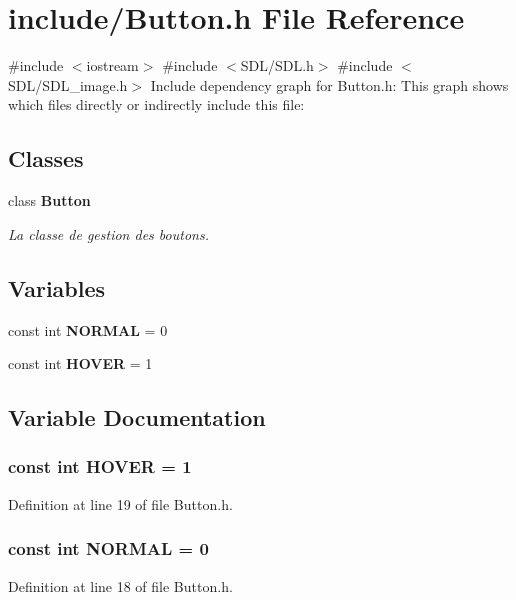 \section{include/\-Button.h \-File \-Reference}
\label{_button_8h}
{\ttfamily \#include $<$iostream$>$}\*
{\ttfamily \#include $<$\-S\-D\-L/\-S\-D\-L.\-h$>$}\*
{\ttfamily \#include $<$\-S\-D\-L/\-S\-D\-L\-\_\-image.\-h$>$}\*
\-Include dependency graph for \-Button.\-h\-:
\-This graph shows which files directly or indirectly include this file\-:
\subsection*{\-Classes}
\begin{DoxyCompactItemize}
\item 
class {\bf \-Button}
\begin{DoxyCompactList}\small\item\em \-La classe de gestion des boutons. \end{DoxyCompactList}\end{DoxyCompactItemize}
\subsection*{\-Variables}
\begin{DoxyCompactItemize}
\item 
const int {\bf \-N\-O\-R\-M\-A\-L} = 0
\item 
const int {\bf \-H\-O\-V\-E\-R} = 1
\end{DoxyCompactItemize}


\subsection{\-Variable \-Documentation}
\subsubsection[{\-H\-O\-V\-E\-R}]{\setlength{\rightskip}{0pt plus 5cm}const int {\bf \-H\-O\-V\-E\-R} = 1}\label{_button_8h_a09f5776aff1a48a6c8ece990564f2c3c}


\-Definition at line 19 of file \-Button.\-h.

\subsubsection[{\-N\-O\-R\-M\-A\-L}]{\setlength{\rightskip}{0pt plus 5cm}const int {\bf \-N\-O\-R\-M\-A\-L} = 0}\label{_button_8h_abb9dfad4c0ff56985bd9d4e2c76077f6}


\-Definition at line 18 of file \-Button.\-h.


